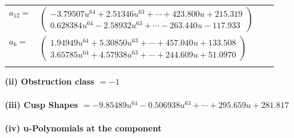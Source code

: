 \documentclass[1p]{elsarticle_modified}
\theoremstyle{definition}
\begin{document}
\begin{tabular}{m{7pt} m{180pt} m{7pt} m{180pt} }
\flushright $a_{12}=$&$\begin{pmatrix}-3.79507 u^{64}+2.51346 u^{63}+\cdots+423.800 u+215.319\\0.628384 u^{64}-2.58932 u^{63}+\cdots-263.440 u-117.933\end{pmatrix}$ \\
\flushright $a_{6}=$&$\begin{pmatrix}1.94949 u^{64}+5.30850 u^{63}+\cdots+457.040 u+133.508\\3.65785 u^{64}+4.57938 u^{63}+\cdots+244.609 u+51.0970\end{pmatrix}$\\&\end{tabular}
\flushleft \textbf{(ii) Obstruction class $= -1$}\\~\\
\flushleft \textbf{(iii) Cusp Shapes $= -9.85489 u^{64}-0.506938 u^{63}+\cdots+295.659 u+281.817$}\\~\\
\newpage\renewcommand{\arraystretch}{1}
\flushleft \textbf{(iv) u-Polynomials at the component}\newline \\
\end{document}
